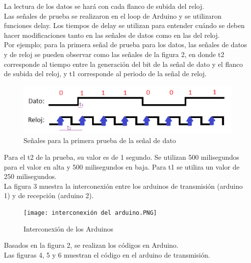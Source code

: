 \documentclass{article}
\begin{document}
La lectura de los datos se hará con cada flanco de subida del reloj.\\

Las señales de prueba se realizaron en el loop de Arduino y se utilizaron funciones delay. Los tiempos de delay se utilizan para entender cuándo se deben hacer modificaciones tanto en las señales de datos como en las del reloj.\\

Por ejemplo; para la primera señal de prueba para los datos, las señales de datos y de reloj se pueden observar como las señales de la figura 2, en donde t2 corresponde al tiempo entre la generación del bit de la señal de dato y el flanco de subida del reloj, y t1 corresponde al periodo de la señal de reloj.\\


\begin{figure}[h]
\includegraphics[width=12cm]{Prueba_datos_y_clock.PNG}
\centering
\caption{Señales para la primera prueba de la señal de dato}
\label{fig:Prueba_datos_y_clock.PNG}
\end{figure}


Para el t2 de la prueba, su valor es de 1 segundo. Se utilizan 500 milisegundos para el valor en alta y 500 milisegundos en baja. Para t1 se utiliza un valor de 250 milisegundos.\\


La figura 3 muestra la interconexión entre los arduinos de transmisión (arduino 1) y de recepción (arduino 2).\\


\begin{figure}[h]
\texttt{[image: interconexión del arduino.PNG]}
\centering
\caption{Interconexión de los Arduinos}
\label{fig:interconexión del arduino.PNG}
\end{figure}

Basados en la figura 2, se realizan los códigos en Arduino.\\


Las figuras 4, 5 y 6 muestran el código en el arduino de transmisión.\\
\end{document}
